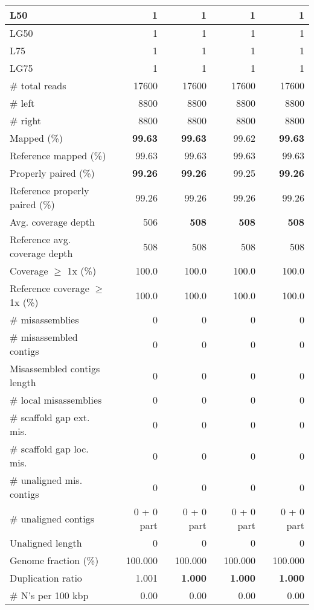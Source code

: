 \documentclass[12pt,a4paper]{article}
\begin{document}
\begin{table}[ht]
\begin{center}
\begin{tabular}{|l*{4}{|r}|}
L50 & 1 & 1 & 1 & 1 \\ \hline
LG50 & 1 & 1 & 1 & 1 \\ \hline
L75 & 1 & 1 & 1 & 1 \\ \hline
LG75 & 1 & 1 & 1 & 1 \\ \hline
\# total reads & 17600 & 17600 & 17600 & 17600 \\ \hline
\# left & 8800 & 8800 & 8800 & 8800 \\ \hline
\# right & 8800 & 8800 & 8800 & 8800 \\ \hline
Mapped (\%) & {\bf 99.63} & {\bf 99.63} & 99.62 & {\bf 99.63} \\ \hline
Reference mapped (\%) & 99.63 & 99.63 & 99.63 & 99.63 \\ \hline
Properly paired (\%) & {\bf 99.26} & {\bf 99.26} & 99.25 & {\bf 99.26} \\ \hline
Reference properly paired (\%) & 99.26 & 99.26 & 99.26 & 99.26 \\ \hline
Avg. coverage depth & 506 & {\bf 508} & {\bf 508} & {\bf 508} \\ \hline
Reference avg. coverage depth & 508 & 508 & 508 & 508 \\ \hline
Coverage $\geq$ 1x (\%) & 100.0 & 100.0 & 100.0 & 100.0 \\ \hline
Reference coverage $\geq$ 1x (\%) & 100.0 & 100.0 & 100.0 & 100.0 \\ \hline
\# misassemblies & 0 & 0 & 0 & 0 \\ \hline
\# misassembled contigs & 0 & 0 & 0 & 0 \\ \hline
Misassembled contigs length & 0 & 0 & 0 & 0 \\ \hline
\# local misassemblies & 0 & 0 & 0 & 0 \\ \hline
\# scaffold gap ext. mis. & 0 & 0 & 0 & 0 \\ \hline
\# scaffold gap loc. mis. & 0 & 0 & 0 & 0 \\ \hline
\# unaligned mis. contigs & 0 & 0 & 0 & 0 \\ \hline
\# unaligned contigs & 0 + 0 part & 0 + 0 part & 0 + 0 part & 0 + 0 part \\ \hline
Unaligned length & 0 & 0 & 0 & 0 \\ \hline
Genome fraction (\%) & 100.000 & 100.000 & 100.000 & 100.000 \\ \hline
Duplication ratio & 1.001 & {\bf 1.000} & {\bf 1.000} & {\bf 1.000} \\ \hline
\# N's per 100 kbp & 0.00 & 0.00 & 0.00 & 0.00 \\ \hline

\end{tabular}
\end{center}
\end{table}
\end{document}

